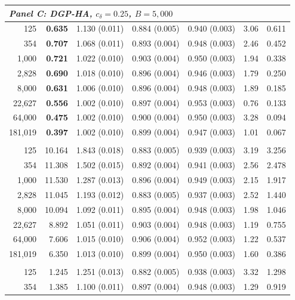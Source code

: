 \begin{tabular}{rrcccrr}
\multicolumn{7}{l}{\textit{Panel C: DGP-HA, $c_\delta=0.25$, $B=5,000$}} \\
\midrule
125 & \textbf{0.635} & 1.130 (0.011) & 0.884 (0.005) & 0.940 (0.003) & 3.06 & 0.611 \\
354 & \textbf{0.707} & 1.068 (0.011) & 0.893 (0.004) & 0.948 (0.003) & 2.46 & 0.452 \\
1,000 & \textbf{0.721} & 1.022 (0.010) & 0.903 (0.004) & 0.950 (0.003) & 1.94 & 0.338 \\
2,828 & \textbf{0.690} & 1.018 (0.010) & 0.896 (0.004) & 0.946 (0.003) & 1.79 & 0.250 \\
8,000 & \textbf{0.631} & 1.006 (0.010) & 0.896 (0.004) & 0.948 (0.003) & 1.89 & 0.185 \\
22,627 & \textbf{0.556} & 1.002 (0.010) & 0.897 (0.004) & 0.953 (0.003) & 0.76 & 0.133 \\
64,000 & \textbf{0.475} & 1.002 (0.010) & 0.900 (0.004) & 0.950 (0.003) & 3.28 & 0.094 \\
181,019 & \textbf{0.397} & 1.002 (0.010) & 0.899 (0.004) & 0.947 (0.003) & 1.01 & 0.067 \\
\addlinespace
\multicolumn{7}{l}{\textit{Panel D: DGP-HB, $c_\delta=1.00$, $B=5,000$}} \\
\midrule
125 & 10.164 & 1.843 (0.018) & 0.883 (0.005) & 0.939 (0.003) & 3.19 & 3.256 \\
354 & 11.308 & 1.502 (0.015) & 0.892 (0.004) & 0.941 (0.003) & 2.56 & 2.478 \\
1,000 & 11.530 & 1.287 (0.013) & 0.896 (0.004) & 0.949 (0.003) & 2.15 & 1.917 \\
2,828 & 11.045 & 1.193 (0.012) & 0.883 (0.005) & 0.937 (0.003) & 2.52 & 1.440 \\
8,000 & 10.094 & 1.092 (0.011) & 0.895 (0.004) & 0.948 (0.003) & 1.98 & 1.046 \\
22,627 & 8.892 & 1.051 (0.011) & 0.903 (0.004) & 0.948 (0.003) & 1.19 & 0.755 \\
64,000 & 7.606 & 1.015 (0.010) & 0.906 (0.004) & 0.952 (0.003) & 1.22 & 0.537 \\
181,019 & 6.350 & 1.013 (0.010) & 0.899 (0.004) & 0.950 (0.003) & 1.60 & 0.386 \\
\addlinespace
\multicolumn{7}{l}{\textit{Panel E: DGP-HB, $c_\delta=0.35$, $B=5,000$}} \\
\midrule
125 & 1.245 & 1.251 (0.013) & 0.882 (0.005) & 0.938 (0.003) & 3.32 & 1.298 \\
354 & 1.385 & 1.100 (0.011) & 0.897 (0.004) & 0.948 (0.003) & 1.29 & 0.919 \\

\end{tabular}
